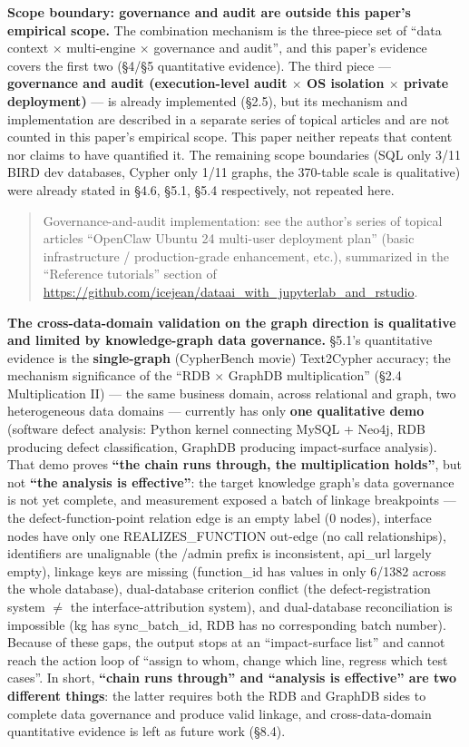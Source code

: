 \documentclass[11pt]{article}
\begin{document}
\textbf{ Scope boundary: governance and audit are outside this paper's empirical scope.} The combination mechanism is the three-piece set of ``data context $\times$ multi-engine $\times$ governance and audit'', and this paper's evidence covers the first two (\S{}4/\S{}5 quantitative evidence). The third piece --- \textbf{governance and audit (execution-level audit $\times$ OS isolation $\times$ private deployment)} --- is already implemented (\S{}2.5), but its mechanism and implementation are described in a separate series of topical articles and are not counted in this paper's empirical scope. This paper neither repeats that content nor claims to have quantified it. The remaining scope boundaries (SQL only 3/11 BIRD dev databases, Cypher only 1/11 graphs, the 370-table scale is qualitative) were already stated in \S{}4.6, \S{}5.1, \S{}5.4 respectively, not repeated here.

\begin{quote}
Governance-and-audit implementation: see the author's series of topical articles ``OpenClaw Ubuntu 24 multi-user deployment plan'' (basic infrastructure / production-grade enhancement, etc.), summarized in the ``Reference tutorials'' section of \url{https://github.com/icejean/dataai_with_jupyterlab_and_rstudio}.
\end{quote}

\textbf{ The cross-data-domain validation on the graph direction is qualitative and limited by knowledge-graph data governance.} \S{}5.1's quantitative evidence is the \textbf{single-graph} (CypherBench movie) Text2Cypher accuracy; the mechanism significance of the ``RDB $\times$ GraphDB multiplication'' (\S{}2.4 Multiplication II) --- the same business domain, across relational and graph, two heterogeneous data domains --- currently has only \textbf{one qualitative demo} (software defect analysis: Python kernel connecting MySQL + Neo4j, RDB producing defect classification, GraphDB producing impact-surface analysis). That demo proves \textbf{``the chain runs through, the multiplication holds''}, but not \textbf{``the analysis is effective''}: the target knowledge graph's data governance is not yet complete, and measurement exposed a batch of linkage breakpoints --- the defect-function-point relation edge is an empty label (0 nodes), interface nodes have only one REALIZES\_FUNCTION out-edge (no call relationships), identifiers are unalignable (the /admin prefix is inconsistent, api\_url largely empty), linkage keys are missing (function\_id has values in only 6/1382 across the whole database), dual-database criterion conflict (the defect-registration system $\neq$ the interface-attribution system), and dual-database reconciliation is impossible (kg has sync\_batch\_id, RDB has no corresponding batch number). Because of these gaps, the output stops at an ``impact-surface list'' and cannot reach the action loop of ``assign to whom, change which line, regress which test cases''. In short, \textbf{``chain runs through'' and ``analysis is effective'' are two different things}: the latter requires both the RDB and GraphDB sides to complete data governance and produce valid linkage, and cross-data-domain quantitative evidence is left as future work (\S{}8.4).
\end{document}
